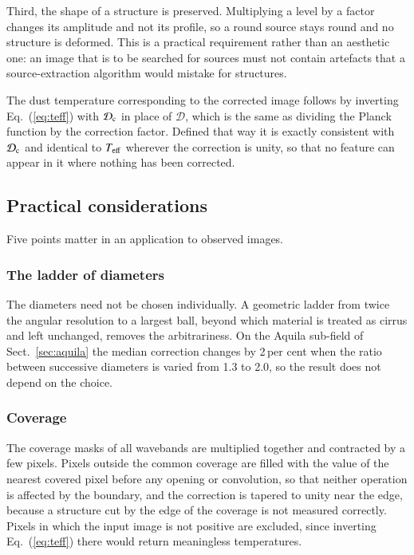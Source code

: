 \documentclass{aa}
\newcommand{\Teff}{T_{\rm eff}}
\newcommand{\Sc}{\mathcal{D}_{\rm c}}
\newcommand{\Sim}{\mathcal{D}}
\begin{document}
Third, the shape of a structure is preserved. Multiplying a level by a factor
changes its amplitude and not its profile, so a round source stays round and no
structure is deformed. This is a practical requirement rather than an aesthetic
one: an image that is to be searched for sources must not contain artefacts
that a source-extraction algorithm would mistake for structures.

The dust temperature corresponding to the corrected image follows by inverting
Eq.~(\ref{eq:teff}) with $\Sc$ in place of $\Sim$, which is the same as
dividing the Planck function by the correction factor. Defined that way it is
exactly consistent with $\Sc$ and identical to $\Teff$ wherever the correction
is unity, so that no feature can appear in it where nothing has been corrected.

\subsection{Practical considerations}
\label{sec:practical}

Five points matter in an application to observed images.

\subsubsection{The ladder of diameters}
\label{sec:ladder}

The diameters need not be chosen individually. A geometric ladder from twice
the angular resolution to a largest ball, beyond which material is treated as
cirrus and left unchanged, removes the arbitrariness. On the Aquila sub-field of
Sect.~\ref{sec:aquila} the median correction changes by 2\,per cent when the
ratio between successive diameters is varied from 1.3 to 2.0, so the result
does not depend on the choice.

\subsubsection{Coverage}
\label{sec:coverage}

The coverage masks of all wavebands are multiplied together and contracted by a
few pixels. Pixels outside the common coverage are filled with the value of the
nearest covered pixel before any opening or convolution, so that neither
operation is affected by the boundary, and the correction is tapered to unity
near the edge, because a structure cut by the edge of the coverage is not
measured correctly. Pixels in which the input image is not positive are
excluded, since inverting Eq.~(\ref{eq:teff}) there would return meaningless
temperatures.
\end{document}
